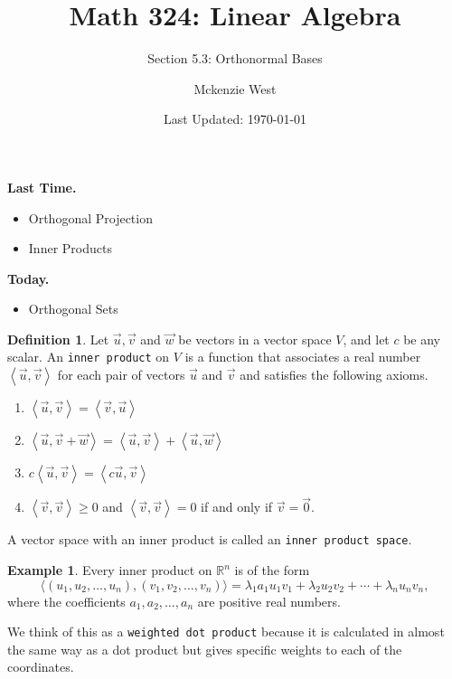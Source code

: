 \documentclass{beamer}
\newcommand{\vecu}{\vec{u}}
\newcommand{\fn}{\insertframenumber}
\newcommand{\ip}[2]{\left\langle #1,#2\right\rangle}
\theoremstyle{definition}
\newtheorem*{defn}{Definition}
\newtheorem*{exa}{Example}
\renewcommand{\emph}[1]{{\color{blue}\texttt{#1}}}
\begin{document}
	\title{Math 324: Linear Algebra}
	\subtitle{Section 5.3: Orthonormal Bases}
	\author{Mckenzie West}
	\date{Last Updated: \today}
\begin{frame}
\maketitle
\end{frame}

\begin{frame}{\insertframenumber}
	\begin{block}{\textbf{Last Time.}}
	\begin{itemize}[label=--]
		\item Orthogonal Projection
		\item Inner Products
	\end{itemize}
	\end{block}
	\begin{block}{\textbf{Today.}}
		\begin{itemize}[label=--]
			\item Orthogonal Sets
		\end{itemize}
	\end{block}
\end{frame}
\begin{frame}{\fn}
	\begin{defn}
		Let $\vec u,\vec v$ and $\vec w$ be vectors in a vector space $V$, and let $c$ be any scalar.  An \emph{inner product} on $V$ is a function that associates a real number $\ip{\vecu}{\vec v}$ for each pair of vectors $\vec u$ and $\vec v$ and satisfies the following axioms.
		\begin{enumerate}[label=\textbf{\arabic*.}]
			\item $\ip{\vec u}{\vec v}=\ip{\vec v}{\vec u}$
			\item $\ip{\vec u}{\vec v+\vec w}=\ip{\vec u}{\vec v}+\ip{\vec u}{\vec w}$
			\item $c\ip{\vec u}{\vec v}=\ip{c\vec u}{\vec v}$
			\item $\ip{\vec v}{\vec v}\geq 0$ and $\ip{\vec v}{\vec v}=0$ if and only if $\vec v=\vec 0$.
		\end{enumerate}
	
		A vector space with an inner product is called an \emph{inner product space}.
	\end{defn}
\end{frame}
\begin{frame}{\fn}
	\begin{exa}
		Every inner product on $\mathbb{R}^n$ is of the form
			\[\langle(u_1,u_2,\dots,u_n),(v_1,v_2,\dots,v_n)\rangle=
			\lambda_1 a_1u_1v_1+\lambda_2u_2v_2+\cdots+\lambda_nu_nv_n,\]
		where the coefficients $a_1,a_2,\dots,a_n$ are positive real numbers.
		
		We think of this as a \emph{weighted dot product} because it is calculated in almost the same way as a dot product but gives specific weights to each of the coordinates.
	\end{exa}
\end{frame}
\end{document}

